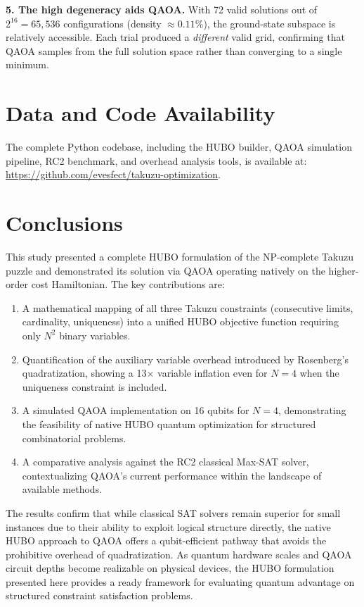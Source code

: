 \documentclass[eng]{ajceam-class}
\begin{document}
\textbf{5. The high degeneracy aids QAOA.} With 72 valid solutions out of $2^{16} = 65{,}536$ configurations (density $\approx 0.11\%$), the ground-state subspace is relatively accessible. Each trial produced a \emph{different} valid grid, confirming that QAOA samples from the full solution space rather than converging to a single minimum.

\section*{Data and Code Availability}
The complete Python codebase, including the HUBO builder, QAOA simulation pipeline, RC2 benchmark, and overhead analysis tools, is available at: \url{https://github.com/evesfect/takuzu-optimization}.

\section{Conclusions}

This study presented a complete HUBO formulation of the NP-complete Takuzu puzzle and demonstrated its solution via QAOA operating natively on the higher-order cost Hamiltonian. The key contributions are:

\begin{enumerate}
 \item A mathematical mapping of all three Takuzu constraints (consecutive limits, cardinality, uniqueness) into a unified HUBO objective function requiring only $N^2$ binary variables.
 \item Quantification of the auxiliary variable overhead introduced by Rosenberg's quadratization, showing a 13$\times$ variable inflation even for $N=4$ when the uniqueness constraint is included.
 \item A simulated QAOA implementation on 16 qubits for $N=4$, demonstrating the feasibility of native HUBO quantum optimization for structured combinatorial problems.
 \item A comparative analysis against the RC2 classical Max-SAT solver, contextualizing QAOA's current performance within the landscape of available methods.
\end{enumerate}

The results confirm that while classical SAT solvers remain superior for small instances due to their ability to exploit logical structure directly, the native HUBO approach to QAOA offers a qubit-efficient pathway that avoids the prohibitive overhead of quadratization. As quantum hardware scales and QAOA circuit depths become realizable on physical devices, the HUBO formulation presented here provides a ready framework for evaluating quantum advantage on structured constraint satisfaction problems.
\end{document}
